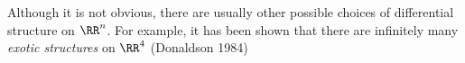 Although it is not obvious, there are usually other possible choices of differential structure on \(\RR^n\). For example, it has been shown that there are infinitely many \emph{exotic structures} on \(\RR^4\) (Donaldson 1984)

